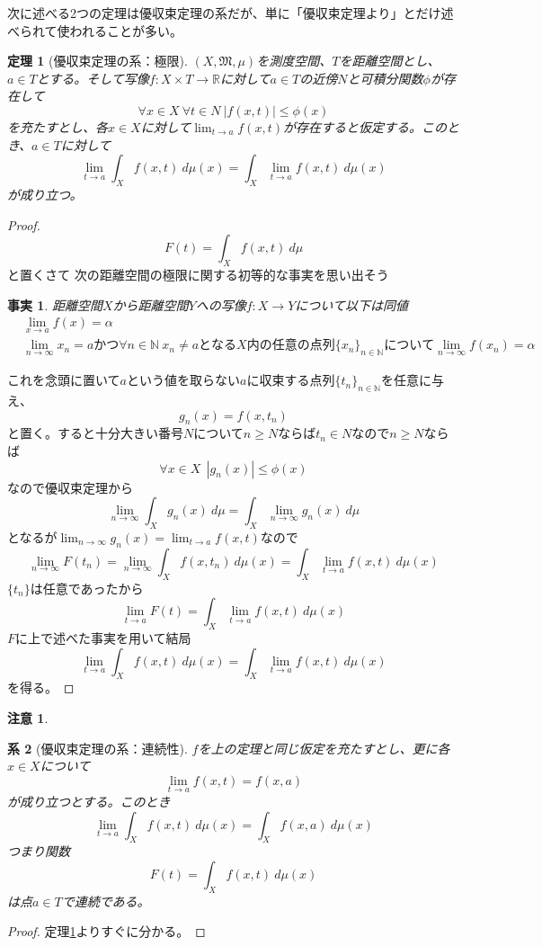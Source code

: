 \documentclass[leqno]{jsarticle}
\newtheorem{thm}{定理}
\newtheorem{cor}[thm]{系}
\newtheorem*{cau}{注意}
\newtheorem*{fact*}{事実}
\newcommand{\nn}{\mathbb{N}}
\newcommand{\rr}{\mathbb{R}}
\newcommand{\mgn}{\infty}
\newcommand{\dpst}{\displaystyle}
\newcommand{\mm}{\mathfrak{M}}
\newcommand{\al}{\alpha}
\begin{document}
\setcounter{equation}{0}
次に述べる2つの定理は優収束定理の系だが、単に「優収束定理より」とだけ述べられて使われることが多い。
\begin{thm}[優収束定理の系：極限]\label{abc}$(X,\mm,\mu)$を測度空間、$T$を距離空間とし、$a\in T$とする。そして写像$f:X\times T\to \rr$に対して$a\in T$の近傍$N$と可積分関数$\phi$が存在して
\[
\forall x\in X\ \forall t\in N\ |f(x,t)|\le \phi(x)
\]を充たすとし、各$x\in X$に対して$\dpst \lim_{t\to a}f(x,t)$が存在すると仮定する。このとき、$a\in T$に対して
\[
\lim_{t\to a}\int_{X}f(x,t)\ d\mu(x)=\int_{X}\lim_{t\to a}f(x,t)\ d\mu(x)
\]
が成り立つ。
\end{thm}
\begin{proof}
\[
F(t)=\int_{X}f(x,t)\ d\mu
\]
と置くさて
次の距離空間の極限に関する初等的な事実を思い出そう
\begin{fact*}\label{jijitu}距離空間$X$から距離空間$Y$への写像$f:X\to Y$について以下は同値
\begin{eqnarray}
&\lim_{x\to a}f(x)=\al\\ 
&\lim_{n\to \mgn}x_n=aかつ\forall n\in \nn\  x_n\neq aとなるX内の任意の点列\{x_n\}_{n\in \nn}について\lim_{n\to \mgn}f(x_n)=\al
\end{eqnarray}
\end{fact*}
これを念頭に置いて$a$という値を取らない$a$に収束する点列$\{t_n\}_{n\in \nn}$を任意に与え、
\[
g_n(x)=f(x,t_n)
\]
と置く。すると十分大きい番号$N$について$n\ge N$ならば$t_n\in N$なので$n\ge N$ならば
\[
\forall x\in X\ \ |g_n(x)|\le \phi(x)
\]
なので優収束定理から
\[
\lim_{n\to \mgn}\int_{X}g_n(x)\ d\mu=\int_{X}\lim_{n\to \mgn}g_n(x)\ d\mu
\]となるが$\dpst \lim_{n\to \mgn}g_n(x)=\lim_{t\to a}f(x,t)$なので
\[
\lim_{n\to \mgn}F(t_n)=\lim_{n\to \mgn}\int_{X}f(x,t_n)\ d\mu(x)=\int_{X}\lim_{t\to a}f(x,t)\ d\mu(x)
\]
$\{t_n\}$は任意であったから
\[
\lim_{t\to a}F(t)=\int_{X}\lim_{t\to a}f(x,t)\ d\mu(x)
\]
$F$に上で述べた事実を用いて結局
\[
\lim_{t\to a}\int_{X}f(x,t)\ d\mu(x)=\int_{X}\lim_{t\to a}f(x,t)\ d\mu(x)
\]
を得る。
\end{proof}
\begin{cau}
\end{cau}


\begin{cor}[優収束定理の系：連続性]$f$を上の定理と同じ仮定を充たすとし、更に各$x\in X$について
\[
\lim_{t\to a}f(x,t)=f(x,a)
\]
が成り立つとする。このとき
\[
\lim_{t\to a}\int_{X}f(x,t)\ d\mu(x)=\int_{X}f(x,a)\ d\mu(x)
\]つまり関数
\[
F(t)=\int_{X}f(x,t)\ d\mu(x)
\]
は点$a\in T$で連続である。
\end{cor}
\begin{proof}定理\ref{abc}よりすぐに分かる。
\end{proof}
\end{document}
